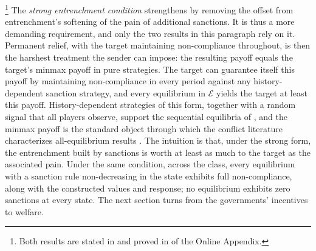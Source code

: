 \footnote{Both results are stated in
 and proved in  of the
Online Appendix.} The \emph{strong entrenchment
condition} strengthens  by removing the
offset from entrenchment's softening of the pain of additional sanctions. It is thus a
more demanding requirement, and only the two results in this paragraph rely on it.
Permanent relief, with the target maintaining non-compliance throughout, is then
the harshest treatment the sender can impose: the resulting payoff equals
the target's minmax payoff in pure strategies. The target can guarantee itself this
payoff by maintaining non-compliance in every period against any history-dependent
sanction strategy, and every equilibrium in $\mathcal E$ yields the target at least this
payoff. History-dependent strategies of this form, together with a random signal that all
players observe, support the sequential equilibria of \citet{PhelanStacchetti2001}, and the minmax payoff is the
standard object through which the conflict literature characterizes all-equilibrium
results \citep{Powell2004,KraininWiseman2016}. The intuition is that, under the strong
form, the entrenchment built by sanctions is worth at least as much to the target as
the associated pain. Under the same condition, across the class, every equilibrium with
a sanction rule non-decreasing in the state exhibits full non-compliance, along with the
constructed values and response; no equilibrium exhibits zero sanctions at every state.
The next section turns from the governments' incentives to welfare.
